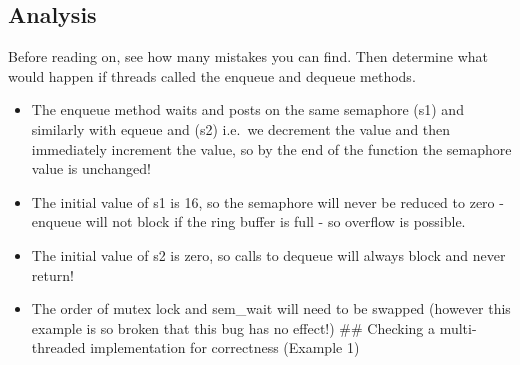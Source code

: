 \begin{Shaded}
\begin{Highlighting}[]
 
 
 
    \NormalTok{, }\NormalTok{)}
    \NormalTok{, }\NormalTok{)}
\NormalTok{\}}

 

 
    \NormalTok{b[ (in++) & (N}\NormalTok{) ] = value}

\NormalTok{\}}
 
     \NormalTok{*result = b[(out++) & (N}\NormalTok{) ]}
     
\NormalTok{\}}
\end{Highlighting}
\end{Shaded}

\subsection{Analysis}\label{analysis}

Before reading on, see how many mistakes you can find. Then determine
what would happen if threads called the enqueue and dequeue methods.

\begin{itemize}
\tightlist
\item
  The enqueue method waits and posts on the same semaphore (s1) and
  similarly with equeue and (s2) i.e.~we decrement the value and then
  immediately increment the value, so by the end of the function the
  semaphore value is unchanged!
\item
  The initial value of s1 is 16, so the semaphore will never be reduced
  to zero - enqueue will not block if the ring buffer is full - so
  overflow is possible.
\item
  The initial value of s2 is zero, so calls to dequeue will always block
  and never return!
\item
  The order of mutex lock and sem\_wait will need to be swapped (however
  this example is so broken that this bug has no effect!) \#\# Checking
  a multi-threaded implementation for correctness (Example 1)
\end{itemize}

